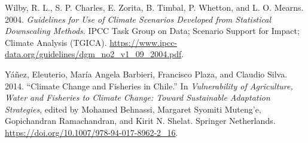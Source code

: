 \documentclass[
  11pt,
]{article}
\newlength{\cslhangindent}
\newenvironment{CSLReferences}[2] %
 {\begin{list}{}{%
  \setlength{\itemindent}{0pt}
  \setlength{\leftmargin}{0pt}
  \setlength{\parsep}{0pt}
  \ifodd #1
   \setlength{\leftmargin}{\cslhangindent}
   \setlength{\itemindent}{-1\cslhangindent}
  \fi
  \setlength{\itemsep}{#2\baselineskip}}}
 {\end{list}}
\begin{document}
\begin{CSLReferences}{1}{1}
Wilby, R. L., S. P. Charles, E. Zorita, B. Timbal, P. Whetton, and L. O. Mearns. 2004. \emph{Guidelines for Use of Climate Scenarios Developed from Statistical Downscaling Methods}. IPCC Task Group on Data; Scenario Support for Impact; Climate Analysis (TGICA). \url{https://www.ipcc-data.org/guidelines/dgm_no2_v1_09_2004.pdf}.

Yáñez, Eleuterio, María Angela Barbieri, Francisco Plaza, and Claudio Silva. 2014. {``Climate Change and Fisheries in Chile.''} In \emph{Vulnerability of Agriculture, Water and Fisheries to Climate Change: Toward Sustainable Adaptation Strategies}, edited by Mohamed Behnassi, Margaret Syomiti Muteng'e, Gopichandran Ramachandran, and Kirit N. Shelat. Springer Netherlands. \url{https://doi.org/10.1007/978-94-017-8962-2_16}.

\end{CSLReferences}
\end{document}
